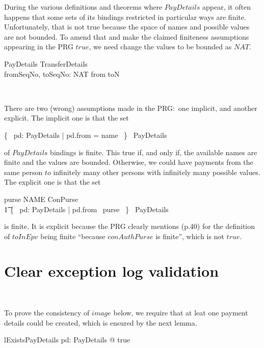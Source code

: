 During the various definitions and theorems where $PayDetails$
appear, it often happens that some sets of its bindings restricted
in particular ways are finite. Unfortunately, that is not true
because the space of names and possible values are not bounded.
To amend that and make the claimed finiteness assumptions appearing
in the PRG $true$, we need change the values to be bounded as $NAT$.
%
\begin{LSDef}
\begin{schema}{PayDetails}
    TransferDetails \\
    fromSeqNo, toSeqNo: NAT
\where
    from \neq toN
\end{schema}~\end{LSDef}
%
There are two (wrong) assumptions made in the PRG:~one implicit,
and another explicit. The implicit one is that the set
%
\begin{gzed}
   \{~ pd: PayDetails | pd.from = name ~\} \in \finset~PayDetails
\end{gzed}
%
of $PayDetails$ bindings is finite. This true if, and only if, the available names
are finite and the values are bounded. Otherwise, we could have
payments from the same person $to$ infinitely many other persons with
infinitely many possible values. The explicit one is that the set
%
\begin{gzed}
   purse \in NAME \ffun ConPurse \implies \\ \t1
   \{~ pd: PayDetails | pd.from \in \dom~purse ~\} \in \finset~PayDetails
\end{gzed}
%
is finite. It is explicit because the PRG clearly mentions (p.40) for
the definition of $toInEpv$ being finite ``because $conAuthPurse$ is finite'',
which is not $true$.

\section{Clear exception log validation}

\begin{LGSet}
\begin{zed}
   [CLEAR]
\end{zed}~\end{LGSet}

To prove the consistency of $image$ below, we require that at
leat one payment details could be created, which is ensured by
the next lemma.
%
\begin{LNewLemma}
\begin{theorem}{lExistsPayDetails}
    \exists pd: PayDetails @ true
\end{theorem}~\end{LNewLemma}


